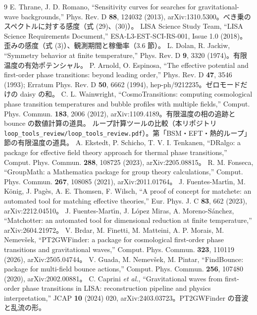 \documentclass[a4paper,10pt]{ltjsarticle}
\begin{document}
\begin{thebibliography}{9}
 E. Thrane, J. D. Romano, ``Sensitivity curves for searches for gravitational-wave backgrounds,'' Phys. Rev. D \textbf{88}, 124032 (2013), arXiv:1310.5300。べき乗のスペクトルに対する感度（式 (29)、(30)）。
 LISA Science Study Team, ``LISA Science Requirements Document,'' ESA-L3-EST-SCI-RS-001, Issue 1.0 (2018)。歪みの感度（式 (3)）、観測期間と稼働率（3.6 節）。
 L. Dolan, R. Jackiw, ``Symmetry behavior at finite temperature,'' Phys. Rev. D \textbf{9}, 3320 (1974)。有限温度の有効ポテンシャル。
 P. Arnold, O. Espinosa, ``The effective potential and first-order phase transitions: beyond leading order,'' Phys. Rev. D \textbf{47}, 3546 (1993); Erratum Phys. Rev. D \textbf{50}, 6662 (1994), hep-ph/9212235。ゼロモードだけの daisy の和。
 C. L. Wainwright, ``CosmoTransitions: computing cosmological phase transition temperatures and bubble profiles with multiple fields,'' Comput. Phys. Commun. \textbf{183}, 2006 (2012), arXiv:1109.4189。有限温度の相の追跡と bounce の数値計算の道具。
 ループ計算ツールの比較（本リポジトリ \nolinkurl{loop_tools_review/loop_tools_review.pdf}）。第「BSM・EFT・熱的ループ」節の有限温度の道具。
 A. Ekstedt, P. Schicho, T. V. I. Tenkanen, ``DRalgo: a package for effective field theory approach for thermal phase transitions,'' Comput. Phys. Commun. \textbf{288}, 108725 (2023), arXiv:2205.08815。
 R. M. Fonseca, ``GroupMath: a Mathematica package for group theory calculations,'' Comput. Phys. Commun. \textbf{267}, 108085 (2021), arXiv:2011.01764。
 J. Fuentes-Mart\'{\i}n, M. K\"onig, J. Pag\`es, A. E. Thomsen, F. Wilsch, ``A proof of concept for matchete: an automated tool for matching effective theories,'' Eur. Phys. J. C \textbf{83}, 662 (2023), arXiv:2212.04510。
 J. Fuentes-Mart\'{\i}n, J. L\'opez Miras, A. Moreno-S\'anchez, ``Matchotter: an automated tool for dimensional reduction at finite temperature,'' arXiv:2604.21972。
 V. Brdar, M. Finetti, M. Matteini, A. P. Morais, M. Nemev\v{s}ek, ``PT2GWFinder: a package for cosmological first-order phase transitions and gravitational waves,'' Comput. Phys. Commun. \textbf{323}, 110119 (2026), arXiv:2505.04744。
 V. Guada, M. Nemev\v{s}ek, M. Pintar, ``FindBounce: package for multi-field bounce actions,'' Comput. Phys. Commun. \textbf{256}, 107480 (2020), arXiv:2002.00881。
 C. Caprini \textit{et al.}, ``Gravitational waves from first-order phase transitions in LISA: reconstruction pipeline and physics interpretation,'' JCAP \textbf{10} (2024) 020, arXiv:2403.03723。PT2GWFinder の音波と乱流の形。

\end{thebibliography}
\end{document}
